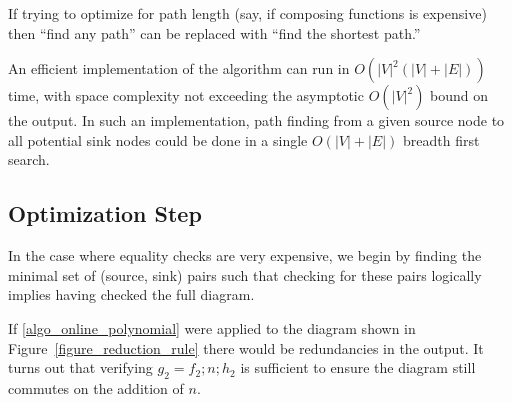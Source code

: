 \documentclass[sigplan]{acmart}
\begin{document}
If trying to optimize for path length (say, if composing functions is expensive) then ``find any path'' can be replaced with ``find the shortest path.''

An efficient implementation of the algorithm can run in $O(|V|^2(|V|+|E|))$ time, with space complexity not exceeding the asymptotic $O(|V|^2)$ bound on the output.
In such an implementation, path finding from a given source node to all potential sink nodes could be done in a single $O(|V|+|E|)$ breadth first search.

\subsection{Optimization Step}

In the case where equality checks are very expensive, we begin by finding the minimal set of (source, sink) pairs such that checking for these pairs logically implies having checked the full diagram.

If \ref{algo_online_polynomial} were applied to the diagram shown in Figure~\ref{figure_reduction_rule} there would be redundancies in the output.
It turns out that verifying $g_2=f_2 ; n ; h_2$ is sufficient to ensure the diagram still commutes on the addition of $n$.
\end{document}

